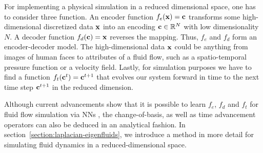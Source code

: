 For implementing a physical simulation in a reduced dimensional space, one has
to consider three function. An encoder function $f_e(\vb{x}) = \vb{c}$
transforms some high-dimensional discretized data $\vb{x}$ into an encoding
$\vb{c} \in \mathbb{R}^{N}$ with low dimensionality $N$. A decoder function
$f_d(\vb{c}) = \vb{x}$ reverses the mapping. Thus, $f_e$ and $f_d$ form an
encoder-decoder model. The high-dimensional data $\vb{x}$ could be anything from
images of human faces to attributes of a fluid flow, such as a spatio-temporal
pressure function or a velocity field. Lastly, for simulation purposes we have
to find a function $f_t(\vb{c}^t) = \vb{c}^{t+1}$ that evolves our system
forward in time to the next time step $\vb{c}^{t+1}$ in the reduced dimension.

Although current advancements show that it is possible to learn $f_e$, $f_d$ and
$f_t$ for fluid flow simulation via NNs \cite{LatentSpaceSubdivision,
Wiewel2019LatentSP}, the change-of-basis, as well as time advancement operators
can also be deduced in an analytical fashion. In
section~\ref{section:laplacian-eigenfluids}, we introduce a method in more
detail for simulating fluid dynamics in a reduced-dimensional space. 

